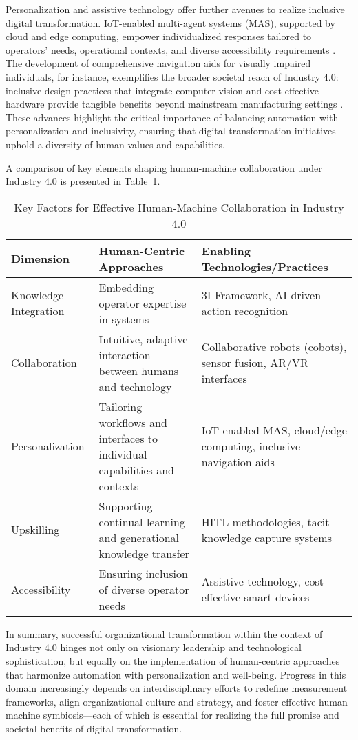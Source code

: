 \documentclass[11pt]{article}
\begin{document}
Personalization and assistive technology offer further avenues to realize inclusive digital transformation. IoT-enabled multi-agent systems (MAS), supported by cloud and edge computing, empower individualized responses tailored to operators' needs, operational contexts, and diverse accessibility requirements \cite{ref54}. The development of comprehensive navigation aids for visually impaired individuals, for instance, exemplifies the broader societal reach of Industry 4.0: inclusive design practices that integrate computer vision and cost-effective hardware provide tangible benefits beyond mainstream manufacturing settings \cite{ref65}. These advances highlight the critical importance of balancing automation with personalization and inclusivity, ensuring that digital transformation initiatives uphold a diversity of human values and capabilities.

A comparison of key elements shaping human-machine collaboration under Industry 4.0 is presented in Table~\ref{tab:collab_factors}.

\begin{table}[h]
\centering
\caption{Key Factors for Effective Human-Machine Collaboration in Industry 4.0}
\label{tab:collab_factors}
\begin{tabular}{|l|p{4.2cm}|p{4.7cm}|}
\hline
\textbf{Dimension} & \textbf{Human-Centric Approaches} & \textbf{Enabling Technologies/Practices} \\
\hline
Knowledge Integration & Embedding operator expertise in systems & 3I Framework, AI-driven action recognition \\
\hline
Collaboration & Intuitive, adaptive interaction between humans and technology & Collaborative robots (cobots), sensor fusion, AR/VR interfaces \\
\hline
Personalization & Tailoring workflows and interfaces to individual capabilities and contexts & IoT-enabled MAS, cloud/edge computing, inclusive navigation aids \\
\hline
Upskilling & Supporting continual learning and generational knowledge transfer & HITL methodologies, tacit knowledge capture systems \\
\hline
Accessibility & Ensuring inclusion of diverse operator needs & Assistive technology, cost-effective smart devices \\
\hline
\end{tabular}
\end{table}

In summary, successful organizational transformation within the context of Industry 4.0 hinges not only on visionary leadership and technological sophistication, but equally on the implementation of human-centric approaches that harmonize automation with personalization and well-being. Progress in this domain increasingly depends on interdisciplinary efforts to redefine measurement frameworks, align organizational culture and strategy, and foster effective human-machine symbiosis—each of which is essential for realizing the full promise and societal benefits of digital transformation.
\end{document}
